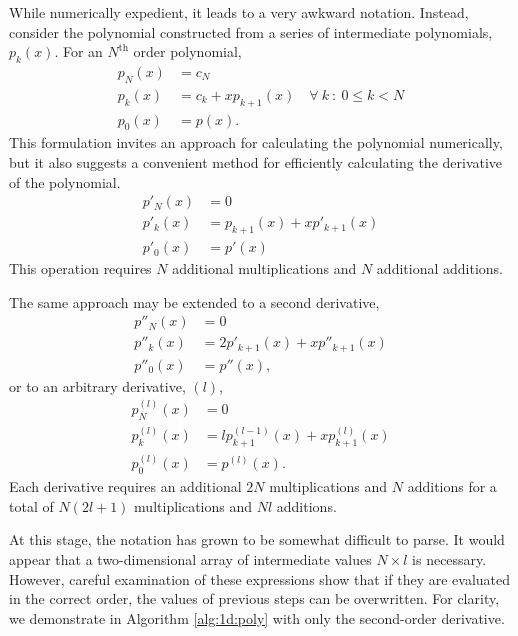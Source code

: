 \documentclass[letterpaper,11pt]{article}
\begin{document}
While numerically expedient, it leads to a very awkward notation.  Instead, consider the polynomial constructed from a series of intermediate polynomials, $p_k(x)$.  For an $N^\mathrm{th}$ order polynomial,
\begin{subequations}
\begin{align}
p_N(x) &= c_N\\
p_k(x) &= c_k + xp_{k+1}(x) \hspace{1em} \forall\ k\ :\ 0 \le k < N\\
p_0(x) &= p(x).
\end{align}
\end{subequations}
This formulation invites an approach for calculating the polynomial numerically, but it also suggests a convenient method for efficiently calculating the derivative of the polynomial.
\begin{subequations}
\begin{align}
p'_N(x) &= 0\\
p'_k(x) &= p_{k+1}(x) + xp'_{k+1}(x)\\
p'_0(x) &= p'(x)
\end{align}
\end{subequations}
This operation requires $N$ additional multiplications and $N$ additional additions.

The same approach may be extended to a second derivative,
\begin{subequations}
\begin{align}
p''_N(x) &= 0\\
p''_k(x) &= 2p'_{k+1}(x) + xp''_{k+1}(x)\\
p''_0(x) &= p''(x),
\end{align}
\end{subequations}
or to an arbitrary derivative, $(l)$,
\begin{subequations}
\begin{align}
p^{(l)}_N(x) &= 0\\
p^{(l)}_k(x) &= lp^{(l-1)}_{k+1}(x) + xp^{(l)}_{k+1}(x)\\
p^{(l)}_0(x) &= p^{(l)}(x).
\end{align}
\end{subequations}
Each derivative requires an additional $2N$ multiplications and $N$ additions for a total of $N(2l+1)$ multiplications and $Nl$ additions.

At this stage, the notation has grown to be somewhat difficult to parse.  It would appear that a two-dimensional array of intermediate values $N\times l$ is necessary.  However, careful examination of these expressions show that if they are evaluated in the correct order, the values of previous steps can be overwritten.  For clarity, we demonstrate in Algorithm \ref{alg:1d:poly} with only the second-order derivative.
\end{document}
